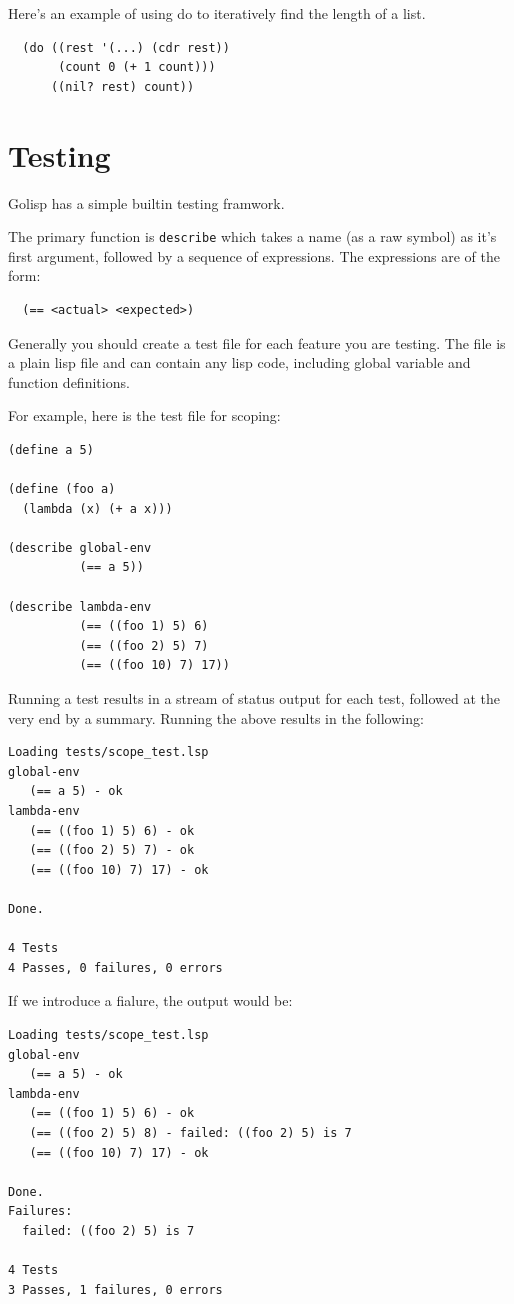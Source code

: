 \documentclass[12pt]{article}
\begin{document}
Here's an example of using do to iteratively find the length of a
list.

\begin{verbatim}
  (do ((rest '(...) (cdr rest))
       (count 0 (+ 1 count)))
      ((nil? rest) count))
\end{verbatim}

\section{Testing}

Golisp has a simple builtin testing framwork.

The primary function is \verb|describe| which takes a name (as a raw
symbol) as it's first argument, followed by a sequence of expressions.
The expressions are of the form:

\begin{verbatim}
  (== <actual> <expected>)
\end{verbatim}

Generally you should create a test file for each feature you are
testing. The file is a plain lisp file and can contain any lisp code,
including global variable and function definitions.

For example, here is the test file for scoping:

\begin{verbatim}
(define a 5)

(define (foo a)
  (lambda (x) (+ a x)))

(describe global-env
          (== a 5))

(describe lambda-env
          (== ((foo 1) 5) 6)
          (== ((foo 2) 5) 7)
          (== ((foo 10) 7) 17))
\end{verbatim}

Running a test results in a stream of status output for each test,
followed at the very end by a summary.  Running the above results in
the following:

\begin{verbatim}
Loading tests/scope_test.lsp
global-env
   (== a 5) - ok
lambda-env
   (== ((foo 1) 5) 6) - ok
   (== ((foo 2) 5) 7) - ok
   (== ((foo 10) 7) 17) - ok

Done.

4 Tests
4 Passes, 0 failures, 0 errors
\end{verbatim}

If we introduce a fialure, the output would be:

\begin{verbatim}
Loading tests/scope_test.lsp
global-env
   (== a 5) - ok
lambda-env
   (== ((foo 1) 5) 6) - ok
   (== ((foo 2) 5) 8) - failed: ((foo 2) 5) is 7
   (== ((foo 10) 7) 17) - ok

Done.
Failures:
  failed: ((foo 2) 5) is 7

4 Tests
3 Passes, 1 failures, 0 errors
\end{verbatim}
\end{document}
